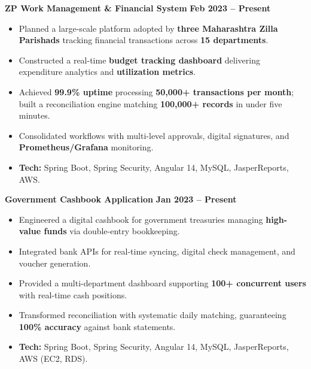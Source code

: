 \documentclass[8pt,a4paper,withhyper]{altacv}
\renewcommand{\cvevent}[4]{%
  {\large\color{emphasis}\textbf{#1}} \ifstrequal{#3}{}{}{\hfill {\normalsize\textbf{\color{accent}#3}}} \par
  \vspace{2pt}
  \ifstrequal{#2}{}{}{%
    {\normalsize\textbf{\color{body}#2}} \ifstrequal{#4}{}{}{\hfill {\normalsize\color{body}#4}} \par
  }%
  \vspace{4pt}\normalsize
}
\begin{document}
\cvevent{ZP Work Management \& Financial System}{}{Feb 2023 -- Present}{}
\begin{itemize}
\item Planned a large-scale platform adopted by \textbf{three Maharashtra Zilla Parishads} tracking financial transactions across \textbf{15 departments}.
\item Constructed a real-time \textbf{budget tracking dashboard} delivering expenditure analytics and \textbf{utilization metrics}.
\item Achieved \textbf{99.9\% uptime} processing \textbf{50,000+ transactions per month}; built a reconciliation engine matching \textbf{100,000+ records} in under five minutes.
\item Consolidated workflows with multi-level approvals, digital signatures, and \textbf{Prometheus/Grafana} monitoring.
\item \textbf{Tech:} Spring Boot, Spring Security, Angular 14, MySQL, JasperReports, AWS.
\end{itemize}

\vspace{4pt}{\color{body!30}\hrule}\vspace{4pt}

\cvevent{Government Cashbook Application}{}{Jan 2023 -- Present}{}
\begin{itemize}
\item Engineered a digital cashbook for government treasuries managing \textbf{high-value funds} via double-entry bookkeeping.
\item Integrated bank APIs for real-time syncing, digital check management, and voucher generation.
\item Provided a multi-department dashboard supporting \textbf{100+ concurrent users} with real-time cash positions.
\item Transformed reconciliation with systematic daily matching, guaranteeing \textbf{100\% accuracy} against bank statements.
\item \textbf{Tech:} Spring Boot, Spring Security, Angular 14, MySQL, JasperReports, AWS (EC2, RDS).
\end{itemize}

\vspace{4pt}{\color{body!30}\hrule}\vspace{4pt}
\end{document}
